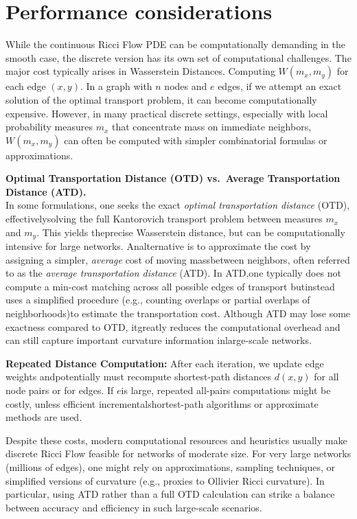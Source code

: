 
\section{Performance considerations}
\label{sec:ricci_flow_networks_performance}

While the continuous Ricci Flow PDE can be computationally demanding in the smooth case, the discrete version has its own set of computational challenges. The major cost typically arises in Wasserstein Distances. Computing $W(m_x, m_y)$ for each edge $(x,y)$. In a graph with $n$ nodes and $e$ edges, if we attempt an exact solution of the optimal transport problem, it can become computationally expensive. However, in many practical discrete settings, especially with local probability measures $m_x$ that concentrate mass on immediate neighbors, $W(m_x,m_y)$ can often be computed with simpler combinatorial formulas or approximations. 

\textbf{Optimal Transportation Distance (OTD) vs.\ Average Transportation Distance (ATD).}
\\
In some formulations, one seeks the exact \emph{optimal transportation distance} (OTD), effectivelysolving the full Kantorovich transport problem between measures $m_x$ and $m_y$. This yields theprecise Wasserstein distance, but can be computationally intensive for large networks. Analternative is to approximate the cost by assigning a simpler, \emph{average} cost of moving massbetween neighbors, often referred to as the \emph{average transportation distance} (ATD). In ATD,one typically does not compute a min-cost matching across all possible edges of transport butinstead uses a simplified procedure (e.g., counting overlaps or partial overlaps of neighborhoods)to estimate the transportation cost. Although ATD may lose some exactness compared to OTD, itgreatly reduces the computational overhead and can still capture important curvature information inlarge-scale networks.
\item \textbf{Repeated Distance Computation:} After each iteration, we update edge weights andpotentially must recompute shortest-path distances $d(x,y)$ for all node pairs or for edges. If $e$is large, repeated all-pairs computations might be costly, unless efficient incrementalshortest-path algorithms or approximate methods are used.


Despite these costs, modern computational resources and heuristics usually make discrete Ricci Flow feasible for networks of moderate size. For very large networks (millions of edges), one might rely on approximations, sampling techniques, or simplified versions of curvature (e.g., proxies to Ollivier Ricci curvature). In particular, using ATD rather than a full OTD calculation can strike a balance between accuracy and efficiency in such large-scale scenarios.



